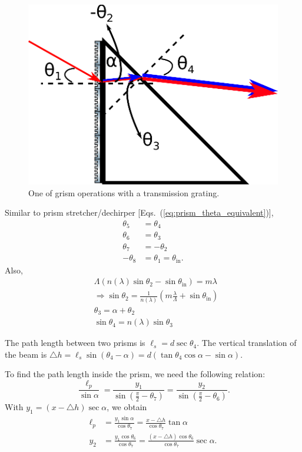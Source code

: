 \documentclass[12pt,hidelinks]{book}
\begin{document}
\begin{figure}[htbp]
\centering
\includegraphics[width=0.4\linewidth]{grism_enlarged v2.pdf}
\caption{One of grism operations with a transmission grating.}
\label{fig:grism_enlarged}
\end{figure}

Similar to prism stretcher/dechirper [Eqs.~(\ref{eq:prism_theta_equivalent})],
\begin{subequations}
\begin{align}
\theta_5 & =\theta_4 \\
\theta_6 & =\theta_3 \\
\theta_7 & =-\theta_2 \\
-\theta_8 & =\theta_1=\theta_{\text{in}}.
\end{align}
\end{subequations}
Also,
\begin{subequations}
\begin{align}
& \Lambda\left(n(\lambda)\sin\theta_2-\sin\theta_{\text{in}}\right)=m\lambda \nonumber \\
&\Rightarrow \sin\theta_2=\frac{1}{n(\lambda)}\left(m\frac{\lambda}{\Lambda}+\sin\theta_{\text{in}}\right) \\[0.5em]
& \theta_3=\alpha+\theta_2 \\
& \sin\theta_4=n(\lambda)\sin\theta_3
\end{align}
\end{subequations}

The path length between two prisms is $\ell_s=d\sec\theta_4$. The vertical translation of the beam is $\triangle h=\ell_s\sin\left(\theta_4-\alpha\right)=d\left(\tan\theta_4\cos\alpha-\sin\alpha\right)$.

To find the path length inside the prism, we need the following relation:
\begin{equation}
\frac{\ell_p}{\sin\alpha}=\frac{y_1}{\sin\left(\frac{\pi}{2}-\theta_7\right)}=\frac{y_2}{\sin\left(\frac{\pi}{2}-\theta_6\right)}.
\end{equation}
With $y_1=\left(x-\triangle h\right)\sec\alpha$, we obtain 
\begin{subequations}
\begin{align}
\ell_p & =\frac{y_1\sin\alpha}{\cos\theta_7}=\frac{x-\triangle h}{\cos\theta_7}\tan\alpha \\
y_2 & =\frac{y_1\cos\theta_6}{\cos\theta_7}=\frac{\left(x-\triangle h\right)\cos\theta_6}{\cos\theta_7}\sec\alpha.
\end{align}
\end{subequations}
\end{document}
